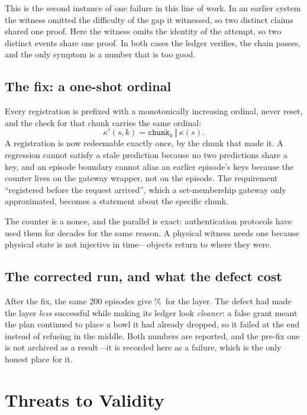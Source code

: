 \documentclass[conference]{IEEEtran}
\theoremstyle{definition}
\begin{document}
This is the second instance of one failure in this line of work. In an earlier
system the witness omitted the difficulty of the gap it witnessed, so two
distinct claims shared one proof. Here the witness omits the identity of the
attempt, so two distinct events share one proof. In both cases the ledger
verifies, the chain passes, and the only symptom is a number that is too good.

\subsection{The fix: a one-shot ordinal}

Every registration is prefixed with a monotonically increasing ordinal, never
reset, and the check for that chunk carries the same ordinal:
\begin{equation}
\kappa'(s,k) = \texttt{chunk}_k \,\Vert\, \kappa(s).
\end{equation}
A registration is now redeemable exactly once, by the chunk that made it. A
regression cannot satisfy a stale prediction because no two predictions share a
key, and an episode boundary cannot alias an earlier episode's keys because the
counter lives on the gateway wrapper, not on the episode. The requirement
``registered before the request arrived'', which a set-membership gateway only
approximated, becomes a statement about the specific chunk.

The counter is a nonce, and the parallel is exact: authentication protocols have
used them for decades for the same reason. A physical witness needs one because
physical state is not injective in time---objects return to where they were.

\subsection{The corrected run, and what the defect cost}

After the fix, the same 200 episodes give \CELAll\%\ for the layer. The defect
had made the layer \emph{less} successful while making its ledger look
\emph{cleaner}: a false grant meant the plan continued to place a bowl it had
already dropped, so it failed at the end instead of refusing in the middle. Both
numbers are reported, and the pre-fix one is not archived as a result---it is
recorded here as a failure, which is the only honest place for it.

\section{Threats to Validity}
\label{sec:threats}
\end{document}
